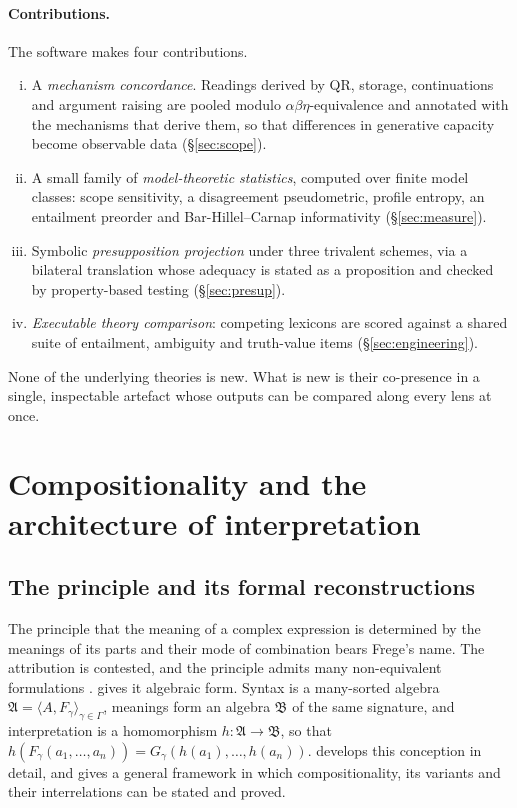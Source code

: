 \documentclass[11pt,a4paper]{article}
\newcommand{\ty}[1]{\langle #1\rangle}
\theoremstyle{definition}
\begin{document}
\paragraph{Contributions.} The software makes four contributions.
\begin{enumerate}[(i)]
\item A \emph{mechanism concordance}. Readings derived by QR, storage, continuations and argument raising are pooled modulo $\alpha\beta\eta$-equivalence and annotated with the mechanisms that derive them, so that differences in generative capacity become observable data (\S\ref{sec:scope}).
\item A small family of \emph{model-theoretic statistics}, computed over finite model classes: scope sensitivity, a disagreement pseudometric, profile entropy, an entailment preorder and Bar-Hillel--Carnap informativity (\S\ref{sec:measure}).
\item Symbolic \emph{presupposition projection} under three trivalent schemes, via a bilateral translation whose adequacy is stated as a proposition and checked by property-based testing (\S\ref{sec:presup}).
\item \emph{Executable theory comparison}: competing lexicons are scored against a shared suite of entailment, ambiguity and truth-value items (\S\ref{sec:engineering}).
\end{enumerate}
None of the underlying theories is new. What is new is their co-presence in a single, inspectable artefact whose outputs can be compared along every lens at once.

\section{Compositionality and the architecture of interpretation}\label{sec:comp}

\subsection{The principle and its formal reconstructions}
The principle that the meaning of a complex expression is determined by the meanings of its parts and their mode of combination bears Frege's name. The attribution is contested, and the principle admits many non-equivalent formulations \citep{janssen1997,paginwesterstahl2010}. \citet{montague1970ug} gives it algebraic form. Syntax is a many-sorted algebra $\mathfrak{A}=\ty{A,F_\gamma}_{\gamma\in\Gamma}$, meanings form an algebra $\mathfrak{B}$ of the same signature, and interpretation is a homomorphism $h:\mathfrak{A}\to\mathfrak{B}$, so that $h(F_\gamma(a_1,\dots,a_n))=G_\gamma(h(a_1),\dots,h(a_n))$. \citet{janssen1997} develops this conception in detail, and \citet{hodges2001} gives a general framework in which compositionality, its variants and their interrelations can be stated and proved.
\end{document}
